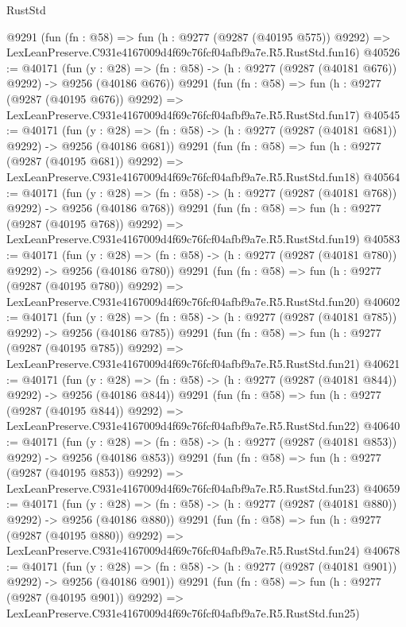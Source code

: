 \begin{lexlean}{RustStd}
\begin{coremodule}
    @9291
    (fun (fn : @58) =>
    fun (h : @9277 (@9287 (@40195 @575)) @9292) =>
    LexLeanPreserve.C931e4167009d4f69c76fcf04afbf9a7e.R5.RustStd.fun16)
@40526 := @40171
    (fun (y : @28) => (fn : @58) -> (h : @9277 (@9287 (@40181 @676)) @9292) -> @9256 (@40186 @676))
    @9291
    (fun (fn : @58) =>
    fun (h : @9277 (@9287 (@40195 @676)) @9292) =>
    LexLeanPreserve.C931e4167009d4f69c76fcf04afbf9a7e.R5.RustStd.fun17)
@40545 := @40171
    (fun (y : @28) => (fn : @58) -> (h : @9277 (@9287 (@40181 @681)) @9292) -> @9256 (@40186 @681))
    @9291
    (fun (fn : @58) =>
    fun (h : @9277 (@9287 (@40195 @681)) @9292) =>
    LexLeanPreserve.C931e4167009d4f69c76fcf04afbf9a7e.R5.RustStd.fun18)
@40564 := @40171
    (fun (y : @28) => (fn : @58) -> (h : @9277 (@9287 (@40181 @768)) @9292) -> @9256 (@40186 @768))
    @9291
    (fun (fn : @58) =>
    fun (h : @9277 (@9287 (@40195 @768)) @9292) =>
    LexLeanPreserve.C931e4167009d4f69c76fcf04afbf9a7e.R5.RustStd.fun19)
@40583 := @40171
    (fun (y : @28) => (fn : @58) -> (h : @9277 (@9287 (@40181 @780)) @9292) -> @9256 (@40186 @780))
    @9291
    (fun (fn : @58) =>
    fun (h : @9277 (@9287 (@40195 @780)) @9292) =>
    LexLeanPreserve.C931e4167009d4f69c76fcf04afbf9a7e.R5.RustStd.fun20)
@40602 := @40171
    (fun (y : @28) => (fn : @58) -> (h : @9277 (@9287 (@40181 @785)) @9292) -> @9256 (@40186 @785))
    @9291
    (fun (fn : @58) =>
    fun (h : @9277 (@9287 (@40195 @785)) @9292) =>
    LexLeanPreserve.C931e4167009d4f69c76fcf04afbf9a7e.R5.RustStd.fun21)
@40621 := @40171
    (fun (y : @28) => (fn : @58) -> (h : @9277 (@9287 (@40181 @844)) @9292) -> @9256 (@40186 @844))
    @9291
    (fun (fn : @58) =>
    fun (h : @9277 (@9287 (@40195 @844)) @9292) =>
    LexLeanPreserve.C931e4167009d4f69c76fcf04afbf9a7e.R5.RustStd.fun22)
@40640 := @40171
    (fun (y : @28) => (fn : @58) -> (h : @9277 (@9287 (@40181 @853)) @9292) -> @9256 (@40186 @853))
    @9291
    (fun (fn : @58) =>
    fun (h : @9277 (@9287 (@40195 @853)) @9292) =>
    LexLeanPreserve.C931e4167009d4f69c76fcf04afbf9a7e.R5.RustStd.fun23)
@40659 := @40171
    (fun (y : @28) => (fn : @58) -> (h : @9277 (@9287 (@40181 @880)) @9292) -> @9256 (@40186 @880))
    @9291
    (fun (fn : @58) =>
    fun (h : @9277 (@9287 (@40195 @880)) @9292) =>
    LexLeanPreserve.C931e4167009d4f69c76fcf04afbf9a7e.R5.RustStd.fun24)
@40678 := @40171
    (fun (y : @28) => (fn : @58) -> (h : @9277 (@9287 (@40181 @901)) @9292) -> @9256 (@40186 @901))
    @9291
    (fun (fn : @58) =>
    fun (h : @9277 (@9287 (@40195 @901)) @9292) =>
    LexLeanPreserve.C931e4167009d4f69c76fcf04afbf9a7e.R5.RustStd.fun25)

\end{coremodule}
\end{lexlean}

